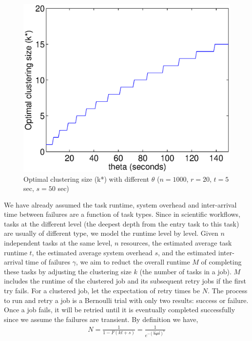 \documentclass{IOS-Book-Article}
\begin{document}
\begin{figure}[!htb]
\centering
  \includegraphics[width=0.95\linewidth]{figure6.eps}
  \caption{Optimal clustering size (k*) with different  $\theta$ ($n=1000$, $r=20$, $t=5$ sec, $s=50$ sec)}
  \label{fig:model_size}
\end{figure}

We have already assumed the task runtime, system overhead and inter-arrival time between failures are a function of task types. Since in scientific workflows, tasks at the different level (the deepest depth from the entry task to this task) are usually of different type, we model the runtime level by level. Given $n$ independent tasks at the same level, $n$ resources, the estimated average task runtime $t$, the estimated average system overhead $s$, and the estimated inter-arrival time of failures $\gamma$, we aim to reduct the overall runtime $M$ of completing these tasks by adjusting the clustering size $k$ (the number of tasks in a job). 
$M$ includes the runtime of the clustered job and its subsequent retry jobs if the first try fails. For a clustered job, let the expectation of retry times be $N$. The process to run and retry a job is a Bernoulli trial with only two results: success or failure. Once a job fails, it will be retried until it is eventually completed successfully since we assume the failures are transient. By definition we have, 
\begin{eqnarray}
\displaystyle
N=\frac{1}{1-F(kt+s)}=\frac{1}{e^{-(\displaystyle\frac{kt+d}{\theta})^{\kappa}}} \nonumber
\end{eqnarray}
\end{document}
